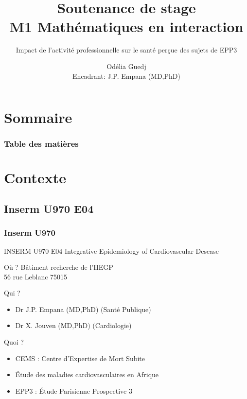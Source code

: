 \documentclass{beamer}
\subtitle{Impact de l'activité professionnelle sur le santé perçue des sujets de EPP3}
\title{Soutenance de stage \\ M1 Mathématiques en interaction}
\author{Odélia Guedj\\ Encadrant: J.P. Empana (MD,PhD)}
\institute{Université Paris Saclay (UEVE) / INSERM U970 E04 }
\begin{document}
\frame{\titlepage}

\section*{Sommaire}
\begin{frame}
\frametitle{Table des matières}
  \tableofcontents
\end{frame} 

\section{Contexte}
\subsection{Inserm U970 E04}

\begin{frame}
\frametitle{Inserm U970}


\pause
\begin{beamerboxesrounded}[upper = titre, lower = texte, shadow = true]{INSERM U970 E04}
\pause
Integrative Epidemiology of Cardiovascular Desease
\end{beamerboxesrounded}

\pause
\begin{beamerboxesrounded}[upper = titre, lower = texte, shadow = true]{Où ?}
\pause
Bâtiment recherche de l'HEGP\\
56 rue Leblanc 75015
\end{beamerboxesrounded}

\pause
\begin{beamerboxesrounded}[upper = titre, lower = texte, shadow = true]{Qui ?}
\pause
\begin{itemize}
\item Dr J.P. Empana (MD,PhD) (Santé Publique)
\pause
\item Dr X. Jouven (MD,PhD) (Cardiologie)
\end{itemize}
\end{beamerboxesrounded}

\pause
\begin{beamerboxesrounded}[upper = titre, lower = texte, shadow = true]{Quoi ?}
\pause
\begin{itemize}
\item CEMS : Centre d'Expertise de Mort Subite
\pause
\item Étude des maladies cardiovasculaires en Afrique
\pause
\item EPP3 : Étude Parisienne Prospective 3 
\end{itemize}
\end{beamerboxesrounded}
\end{frame}
\end{document}
